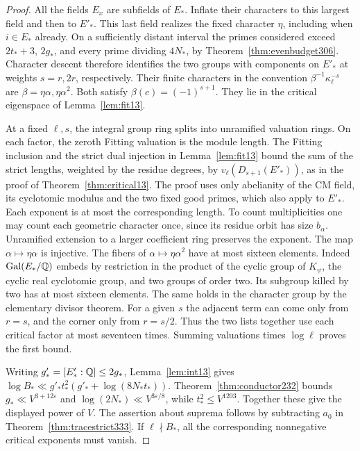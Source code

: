 \documentclass[a4paper,11pt]{article}
\theoremstyle{definition}
\theoremstyle{remark}
\numberwithin{equation}{section}
\begin{document}
\begin{proof}
All the fields \(E_x\) are subfields of \(E_*\). Inflate their
characters to this largest field and then to \(E'_*\). This last
field realizes the fixed character \(\eta\), including when
\(i\in E_*\) already. On a sufficiently distant interval the primes
considered exceed \(2t_*+3\), \(2g_*\), and every prime dividing
\(4N_*\), by Theorem~\ref{thm:evenbudget306}. Character descent
therefore identifies the two groups with components on \(E'_*\)
at weights \(s=r,2r\), respectively. Their finite characters
in the convention \(\beta^{-1}\kappa_\ell^{-s}\) are
\(\beta=\eta\alpha,\eta\alpha^2\). Both satisfy
\(\beta(c)=(-1)^{s+1}\). They lie in the critical eigenspace of
Lemma~\ref{lem:fit13}.

At a fixed \(\ell,s\), the integral group ring splits into unramified
valuation rings. On each factor, the zeroth Fitting valuation is the
module length. The Fitting inclusion and the strict dual injection
in Lemma~\ref{lem:fit13} bound the sum of the strict lengths, weighted
by the residue degrees, by \(v_\ell(D_{s+1}(E'_*))\), as in the proof
of Theorem~\ref{thm:critical13}. The proof uses only abelianity of
the CM field, its cyclotomic modulus and the two fixed good primes,
which also apply to \(E'_*\). Each exponent is at most the corresponding
length. To count multiplicities one may count each geometric character
once, since its residue orbit has size \(b_\alpha\). Unramified
extension to a larger coefficient ring preserves the exponent.
The map \(\alpha\mapsto\eta\alpha\) is injective. The fibers of
\(\alpha\mapsto\eta\alpha^2\) have at most sixteen elements. Indeed
\(\operatorname{Gal}(E_*/\mathbb Q)\) embeds by restriction in the product
of the cyclic group of \(K_\psi\), the cyclic real cyclotomic group,
and two groups of order two. Its subgroup killed by two has at
most sixteen elements. The same holds in the character group by
the elementary divisor theorem. For a given \(s\) the adjacent
term can come only from \(r=s\), and the corner only from \(r=s/2\).
Thus the two lists together use each critical factor at most
seventeen times. Summing valuations times \(\log\ell\) proves
the first bound.

Writing \(g'_*=[E'_*:\mathbb Q]\le2g_*\), Lemma~\ref{lem:int13} gives
\(\log B_*\ll g'_*t_*^2(g'_*+\log(8N_*t_*))\).
Theorem~\ref{thm:conductor232} bounds \(g_*\ll V^{3+12\varepsilon}\)
and \(\log(2N_*)\ll V^{3\varepsilon/8}\), while \(t_*^2\le V^{1203}\).
Together these give the displayed power of \(V\).
The assertion about suprema follows by subtracting \(a_0\) in
Theorem~\ref{thm:tracestrict333}. If \(\ell\nmid B_*\), all the
corresponding nonnegative critical exponents must vanish.
\end{proof}
\end{document}
